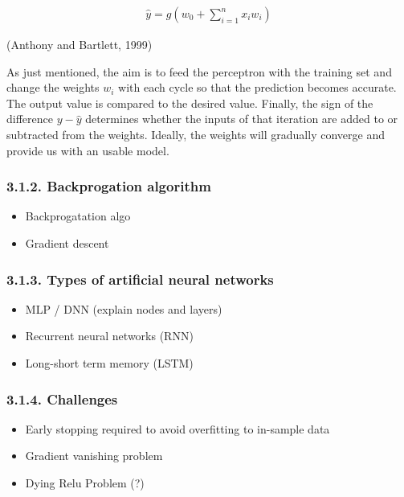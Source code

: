 \documentclass[
]{article}
\begin{document}
\begin{align} \label{eq:perceptron}
\hat{y}=g(w_{0}+\sum_{i=1}^{n}x_{i}w_{i})
\end{align}

(Anthony and Bartlett, 1999)

As just mentioned, the aim is to feed the perceptron with the training
set and change the weights \(w_{i}\) with each cycle so that the
prediction becomes accurate. The output value is compared to the desired
value. Finally, the sign of the difference \(y-\hat{y}\) determines
whether the inputs of that iteration are added to or subtracted from the
weights. Ideally, the weights will gradually converge and provide us
with an usable model.

\hypertarget{backprogation_algorithm}{%
\subsubsection{3.1.2. Backprogation
algorithm}\label{backprogation_algorithm}}

\begin{itemize}
\item
  Backprogatation algo
\item
  Gradient descent
\end{itemize}

\hypertarget{types_of_nn}{%
\subsubsection{3.1.3. Types of artificial neural
networks}\label{types_of_nn}}

\begin{itemize}
\item
  MLP / DNN (explain nodes and layers)
\item
  Recurrent neural networks (RNN)
\item
  Long-short term memory (LSTM)
\end{itemize}

\hypertarget{challenges}{%
\subsubsection{3.1.4. Challenges}\label{challenges}}

\begin{itemize}
\item
  Early stopping required to avoid overfitting to in-sample data
\item
  Gradient vanishing problem
\item
  Dying Relu Problem (?)
\end{itemize}
\end{document}
